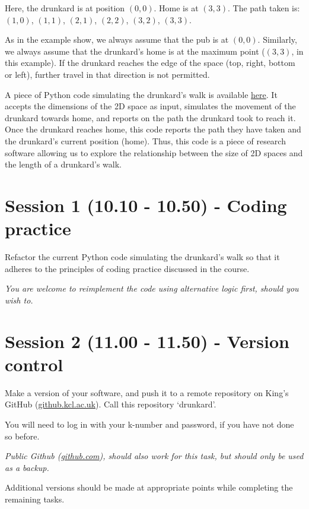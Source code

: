 \documentclass{article}
\begin{document}
Here, the drunkard is at position $(0, 0)$. 
Home is at $(3, 3)$. 
The path taken is: $(1, 0)$, $(1, 1)$, $(2, 1)$, $(2, 2)$, $(3, 2)$, $(3, 3)$.

As in the example show, we always assume that the pub is at $(0, 0)$.
Similarly, we always assume that the drunkard's home is at the maximum point ($(3, 3)$, in this example).
If the drunkard reaches the edge of the space (top, right, bottom or left), further travel in that direction is not permitted.

A piece of Python code simulating the drunkard's walk is available \href{https://github.com/martinteaching/sustainability/blob/master/workshops/kcl/2025/resources/drunkard.py}{here}.
It accepts the dimensions of the 2D space as input, simulates the movement of the drunkard towards home, and reports on the path the drunkard took to reach it.
Once the drunkard reaches home, this code reports the path they have taken and the drunkard's current position (home).
Thus, this code is a piece of research software allowing us to explore the relationship between the size of 2D spaces and the length of a drunkard's walk.

\section{Session 1 (10.10 - 10.50) - Coding practice}

Refactor the current Python code simulating the drunkard's walk so that it adheres to the principles of coding practice discussed in the course.

\emph{You are welcome to reimplement the code using alternative logic first, should you wish to.}

\section{Session 2 (11.00 - 11.50) - Version control}

Make a version of your software, and push it to a remote repository on King's GitHub (\href{https://github.kcl.ac.uk/}{github.kcl.ac.uk}).
Call this repository `drunkard'.

You will need to log in with your k-number and password, if you have not done so before.

\textit{Public Github (\href{https://github.com}{github.com}), should
also work for this task, but should only be used as a backup.}

Additional versions should be made at appropriate points while completing the remaining tasks.
\end{document}

